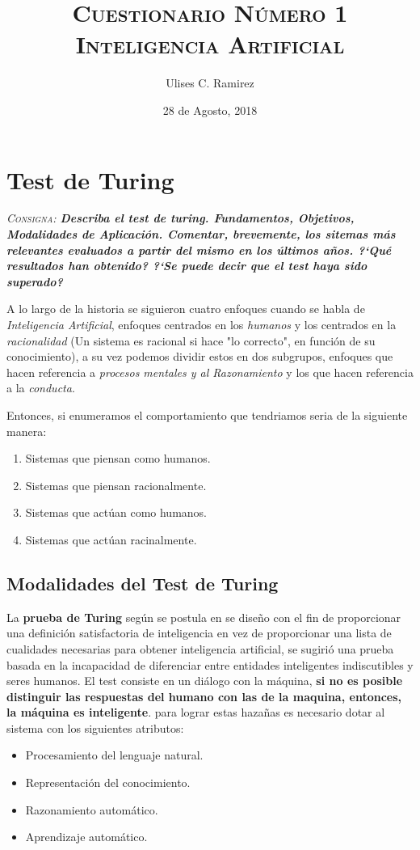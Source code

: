 \documentclass{article}
\title{\textsc{Cuestionario N\'umero 1\\Inteligencia Artificial}}
\author{Ulises C. Ramirez}
\date{28 de Agosto, 2018}
\begin{document}
\maketitle
\newpage
\tableofcontents
\newpage
\section{Test de Turing}
\textit{\textsc{Consigna}: \textbf{Describa el test de turing. Fundamentos, Objetivos, Modalidades de Aplicaci\'on. Comentar, brevemente, los sitemas m\'as relevantes evaluados a partir del mismo en los \'ultimos a\~nos. ?`Qu\'e resultados han obtenido? ?`Se puede decir que el test haya sido superado?}}

A lo largo de la historia se siguieron cuatro enfoques cuando se habla de \textit{Inteligencia Artificial}, enfoques centrados en los \textit{humanos} y los centrados en la \textit{racionalidad} (Un sistema es racional si hace "lo correcto", en funci\'on de su conocimiento), a su vez podemos dividir estos en dos subgrupos, enfoques que hacen referencia a \textit{procesos mentales y al Razonamiento} y los que hacen referencia a la \textit{conducta}.

Entonces, si enumeramos el comportamiento que tendriamos seria de la siguiente manera:
\begin{enumerate}
\item Sistemas que piensan como humanos.
\item Sistemas que piensan racionalmente.
\item Sistemas que act\'uan como humanos.
\item Sistemas que act\'uan racinalmente.
\end{enumerate}

\subsection{Modalidades del Test de Turing}
La \textbf{prueba de Turing} seg\'un se postula en \cite{russel}  se dise\~no con el fin de proporcionar una definici\'on satisfactoria de inteligencia en vez de proporcionar una lista de cualidades necesarias para obtener inteligencia artificial, se sugiri\'o una prueba basada en la incapacidad de diferenciar entre entidades inteligentes indiscutibles y seres humanos. El test consiste en un di\'alogo con la m\'aquina, \textbf{si no es posible distinguir las respuestas del humano con las de la maquina, entonces, la m\'aquina es inteligente}. para lograr estas haza\~nas es necesario dotar al sistema con los siguientes atributos:
\begin{itemize}
\item Procesamiento del lenguaje natural.
\item Representaci\'on del conocimiento.
\item Razonamiento autom\'atico.
\item Aprendizaje autom\'atico.
\end{itemize}
\end{document}
